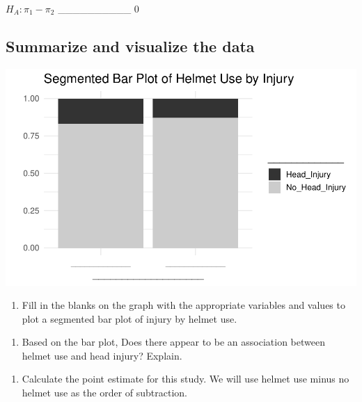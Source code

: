 \documentclass[
]{report}
\providecommand{\tightlist}{%
  \setlength{\itemsep}{0pt}\setlength{\parskip}{0pt}}
\begin{document}
\(H_A: \pi_1 -\pi_2\) \_\_\_\_\_\_\_\_\_\_ 0

\hypertarget{summarize-and-visualize-the-data}{%
\subsection{Summarize and visualize the data}\label{summarize-and-visualize-the-data}}

\begin{center}\includegraphics[width=0.7\linewidth]{07-inference-2cat_files/figure-latex/unnamed-chunk-2-1} \end{center}

\begin{enumerate}
\def\labelenumi{\arabic{enumi}.}
\setcounter{enumi}{11}
\tightlist
\item
  Fill in the blanks on the graph with the appropriate variables and values to plot a segmented bar plot of injury by helmet use.
\end{enumerate}

\vspace{1in}

\begin{enumerate}
\def\labelenumi{\arabic{enumi}.}
\setcounter{enumi}{12}
\tightlist
\item
  Based on the bar plot, Does there appear to be an association between helmet use and head injury? Explain.
\end{enumerate}

\vspace{1in}

\begin{enumerate}
\def\labelenumi{\arabic{enumi}.}
\setcounter{enumi}{13}
\tightlist
\item
  Calculate the point estimate for this study. We will use helmet use minus no helmet use as the order of subtraction.
\end{enumerate}

\vspace{1in}
\end{document}
